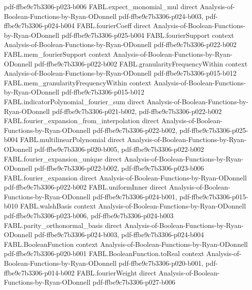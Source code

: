 \begin{theorem}
  {pdf-ffbe9c7b3306-p023-b006}
\proofstep
  {FABL.expect_monomial_mul}
  {direct}
  {Analysis-of-Boolean-Functions-by-Ryan-ODonnell}
  {pdf-ffbe9c7b3306-p024-b003,
    pdf-ffbe9c7b3306-p024-b004}
\proofstep
  {FABL.fourierCoeff}
  {direct}
  {Analysis-of-Boolean-Functions-by-Ryan-ODonnell}
  {pdf-ffbe9c7b3306-p025-b004}
\proofstep
  {FABL.fourierSupport}
  {context}
  {Analysis-of-Boolean-Functions-by-Ryan-ODonnell}
  {pdf-ffbe9c7b3306-p022-b002}
\proofstep
  {FABL.mem_fourierSupport}
  {context}
  {Analysis-of-Boolean-Functions-by-Ryan-ODonnell}
  {pdf-ffbe9c7b3306-p022-b002}
\proofstep
  {FABL.granularityFrequencyWithin}
  {context}
  {Analysis-of-Boolean-Functions-by-Ryan-ODonnell}
  {pdf-ffbe9c7b3306-p015-b012}
\proofstep
  {FABL.mem_granularityFrequencyWithin}
  {context}
  {Analysis-of-Boolean-Functions-by-Ryan-ODonnell}
  {pdf-ffbe9c7b3306-p015-b012}
\proofstep
  {FABL.indicatorPolynomial_fourier_sum}
  {direct}
  {Analysis-of-Boolean-Functions-by-Ryan-ODonnell}
  {pdf-ffbe9c7b3306-p021-b002,
    pdf-ffbe9c7b3306-p022-b002}
\proofstep
  {FABL.fourier_expansion_from_interpolation}
  {direct}
  {Analysis-of-Boolean-Functions-by-Ryan-ODonnell}
  {pdf-ffbe9c7b3306-p022-b002,
    pdf-ffbe9c7b3306-p025-b004}
\proofstep
  {FABL.multilinearPolynomial}
  {direct}
  {Analysis-of-Boolean-Functions-by-Ryan-ODonnell}
  {pdf-ffbe9c7b3306-p020-b005,
    pdf-ffbe9c7b3306-p022-b002}
\proofstep
  {FABL.fourier_expansion_unique}
  {direct}
  {Analysis-of-Boolean-Functions-by-Ryan-ODonnell}
  {pdf-ffbe9c7b3306-p022-b002,
    pdf-ffbe9c7b3306-p023-b006}
\proofstep
  {FABL.fourier_expansion}
  {direct}
  {Analysis-of-Boolean-Functions-by-Ryan-ODonnell}
  {pdf-ffbe9c7b3306-p022-b002}
\proofstep
  {FABL.uniformInner}
  {direct}
  {Analysis-of-Boolean-Functions-by-Ryan-ODonnell}
  {pdf-ffbe9c7b3306-p024-b001,
    pdf-ffbe9c7b3306-p015-b010}
\proofstep
  {FABL.walshBasis}
  {context}
  {Analysis-of-Boolean-Functions-by-Ryan-ODonnell}
  {pdf-ffbe9c7b3306-p023-b006,
    pdf-ffbe9c7b3306-p024-b003}
\proofstep
  {FABL.parity_orthonormal_basis}
  {direct}
  {Analysis-of-Boolean-Functions-by-Ryan-ODonnell}
  {pdf-ffbe9c7b3306-p024-b003,
    pdf-ffbe9c7b3306-p024-b004}
\proofstep
  {FABL.BooleanFunction}
  {context}
  {Analysis-of-Boolean-Functions-by-Ryan-ODonnell}
  {pdf-ffbe9c7b3306-p020-b001}
\proofstep
  {FABL.BooleanFunction.toReal}
  {context}
  {Analysis-of-Boolean-Functions-by-Ryan-ODonnell}
  {pdf-ffbe9c7b3306-p020-b001,
    pdf-ffbe9c7b3306-p014-b002}
\proofstep
  {FABL.fourierWeight}
  {direct}
  {Analysis-of-Boolean-Functions-by-Ryan-ODonnell}
  {pdf-ffbe9c7b3306-p027-b006}

\end{theorem}
